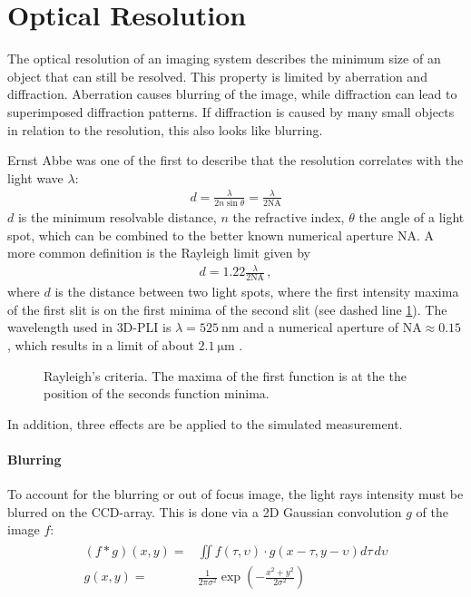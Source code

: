 \section{Optical Resolution}
\label{sec:opticalResolution}
%
The optical resolution of an imaging system describes the minimum size of an object that can still be resolved.
This property is limited by aberration and diffraction.
Aberration causes blurring of the image, while diffraction can lead to superimposed diffraction patterns.
If diffraction is caused by many small objects in relation to the resolution, this also looks like blurring.
\par
%
Ernst Abbe was one of the first to describe that the resolution correlates with the light wave $\lambda$:
\begin{align}
d=\frac{ \lambda}{2 n \sin \theta} = \frac{\lambda}{2\mathrm{NA}}
\end{align}
$d$ is the minimum resolvable distance, $n$ the refractive index, $\theta$ the angle of a light spot, which can be combined to the better known numerical aperture $\mathrm{NA}$.
A more common definition is the Rayleigh limit given by
\begin{align}
d=1.22\frac{\lambda}{2\mathrm{NA}} \, ,
\end{align}
where $d$ is the distance between two light spots, where the first intensity maxima of the first slit is on the first minima of the second slit (see dashed line \cref{fig:rayleigh}).
The wavelength used in \ac{3D-PLI} is $\lambda = \SI{525}{\nano\meter}$ and a numerical aperture of $\mathrm{NA} \approx \SI{0.15}{}$, which results in a limit of about $\SI{2.1}{\micro\meter}$ \cite{MenzelDissertation}.
%
\begin{figure}[!t]
\setlength{\tikzwidth}{0.5\textwidth}
\centering
\caption[]{Rayleigh's criteria. The maxima of the first function is at the the position of the seconds function minima.}
\label{fig:rayleigh}
\end{figure}
%
In addition, three effects are be applied to the simulated measurement.
%
\paragraph{Blurring}
To account for the blurring or out of focus image, the light rays intensity must be blurred on the \ac{CCD}-array.
This is done via a 2D Gaussian convolution $g$ of the image $f$:
\begin{align}
\begin{split}
    (f * g)(x,y) =& \iint f(\tau,\upsilon) \cdot g(x-\tau, y-\upsilon)d\tau \, d\upsilon\\
    g(x,y) =& \frac{1}{2\pi\sigma^2} \exp\left(-\frac{x^2+y^2}{2\sigma^2}\right)
\end{split}
\end{align}
%
